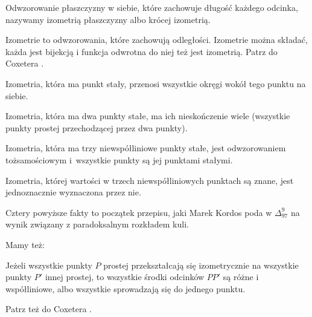 
\begin{definition}
    Odwzorowanie płaszczyzny w siebie, które zachowuje długość każdego odcinka, nazywamy izometrią płaszczyzny albo krócej izometrią.
\end{definition}

Izometrie to odwzorowania, które zachowują odległości.
Izometrie można składać, każda jest bijekcją i funkcja odwrotna do niej też jest izometrią.
Patrz do Coxetera \cite[s. 45-52, 56-63]{coxeter_1967}.

\begin{proposition}
\label{delta_1997_9_start}%
    Izometria, która ma punkt stały, przenosi wszystkie okręgi wokół tego punktu na siebie.
\end{proposition}

\begin{proposition}
    Izometria, która ma dwa punkty stałe, ma ich nieskończenie wiele (wszystkie punkty prostej przechodzącej przez dwa punkty).
\end{proposition}

\begin{proposition}
    Izometria, która ma trzy niewspółliniowe punkty stałe, jest odwzorowaniem tożsamościowym i~wszystkie punkty są jej punktami stałymi.
\end{proposition}

\begin{proposition}
\label{delta_1997_9_end}%
    Izometria, której wartości w trzech niewspółliniowych punktach są znane, jest jednoznacznie wyznaczona przez nie.
\end{proposition}

Cztery powyższe fakty to początek przepisu, jaki Marek Kordos poda w $\Delta_{97}^9$ na wynik związany z paradoksalnym rozkładem kuli.

Mamy też:

\begin{theorem}[Hjelmsleva]
    Jeżeli wszystkie punkty $P$ prostej przekształcają się izometrycznie na wszystkie punkty $P'$ innej prostej, to wszystkie środki odcinków $PP'$ są różne i współliniowe, albo wszystkie sprowadzają się do jednego punktu.
\end{theorem}


Patrz też do Coxetera \cite[s. 63, 64]{coxeter_1967}.